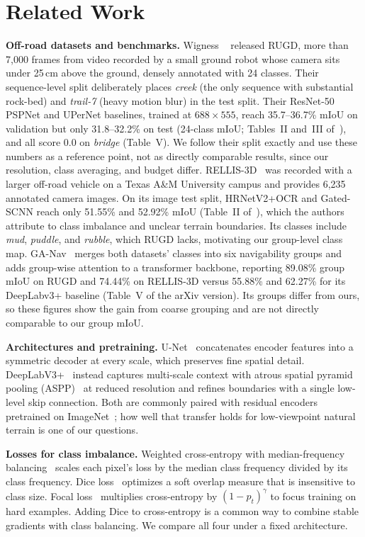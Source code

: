 \section{Related Work}
\label{sec:related}

\textbf{Off-road datasets and benchmarks.} Wigness \etal{}~\cite{wigness2019rugd}
released RUGD, more than 7,000 frames from video recorded by a small ground
robot whose camera sits under 25\,cm above the ground, densely annotated with 24
classes. Their sequence-level split deliberately places \emph{creek} (the only
sequence with substantial rock-bed) and \emph{trail-7} (heavy motion blur) in
the test split. Their ResNet-50 PSPNet and UPerNet baselines, trained at
$688\times555$, reach 35.7--36.7\% mIoU on validation but only 31.8--32.2\% on
test (24-class mIoU; Tables~II and~III of~\cite{wigness2019rugd}), and all score
0.0 on \emph{bridge} (Table~V). We follow their split exactly and use these
numbers as a reference point, not as directly comparable results, since our
resolution, class averaging, and budget differ. RELLIS-3D~\cite{jiang2021rellis}
was recorded with a larger off-road vehicle on a Texas A\&M University campus
and provides 6,235 annotated camera images. On its image test split,
HRNetV2+OCR and Gated-SCNN reach only 51.55\% and 52.92\% mIoU (Table~II
of~\cite{jiang2021rellis}), which the authors attribute to class imbalance and
unclear terrain boundaries. Its classes include \emph{mud}, \emph{puddle}, and
\emph{rubble}, which RUGD lacks, motivating our group-level class map.
GA-Nav~\cite{guan2022ganav} merges both datasets' classes into six navigability
groups and adds group-wise attention to a transformer backbone, reporting
89.08\% group mIoU on RUGD and 74.44\% on RELLIS-3D versus 55.88\% and 62.27\%
for its DeepLabv3+ baseline (Table~V of the arXiv version). Its groups differ
from ours, so these figures show the gain from coarse grouping and are not
directly comparable to our group mIoU.

\textbf{Architectures and pretraining.} U-Net~\cite{ronneberger2015unet}
concatenates encoder features into a symmetric decoder at every scale, which
preserves fine spatial detail. DeepLabV3+~\cite{chen2018deeplabv3plus} instead
captures multi-scale context with atrous spatial pyramid pooling
(ASPP)~\cite{chen2017deeplabv3} at reduced resolution and refines boundaries
with a single low-level skip connection. Both are commonly paired with residual
encoders~\cite{he2016resnet} pretrained on ImageNet~\cite{deng2009imagenet};
how well that transfer holds for low-viewpoint natural terrain is one of our
questions.

\textbf{Losses for class imbalance.} Weighted cross-entropy with
median-frequency balancing~\cite{eigen2015predicting} scales each pixel's loss
by the median class frequency divided by its class frequency. Dice
loss~\cite{milletari2016vnet} optimizes a soft overlap measure that is
insensitive to class size. Focal loss~\cite{lin2017focal} multiplies
cross-entropy by $(1-p_t)^\gamma$ to focus training on hard examples. Adding Dice
to cross-entropy is a common way to combine stable gradients with class
balancing. We compare all four under a fixed architecture.
